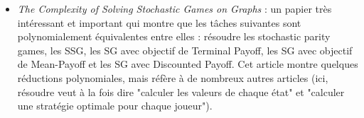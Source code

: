 \documentclass{article}
\theoremstyle{plain}
\begin{document}
\begin{itemize}
\item \textit{The Complexity of Solving Stochastic Games on Graphs} \cite{DBLP:conf/isaac/AnderssonM09} : un papier très intéressant et important qui montre que les tâches suivantes sont polynomialement équivalentes entre elles : résoudre les stochastic parity games, les SSG, les SG avec objectif de Terminal Payoff, les SG avec objectif de Mean-Payoff et les SG avec Discounted Payoff. Cet article montre quelques réductions polynomiales, mais réfère à de nombreux autres articles (ici, résoudre veut à la fois dire "calculer les valeurs de chaque état" et "calculer une stratégie optimale pour chaque joueur").
\end{itemize}



\end{document}
